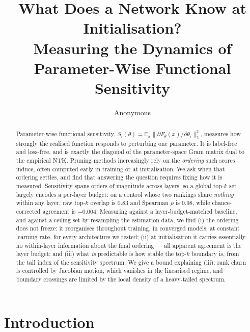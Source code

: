 \documentclass{article}
\title{What Does a Network Know at Initialisation?\\
Measuring the Dynamics of Parameter-Wise Functional Sensitivity}
\author{Anonymous}
\begin{document}
\maketitle

\begin{abstract}
Parameter-wise functional sensitivity, $S_i(\theta)=\mathbb E_x\|\partial F_\theta(x)/\partial\theta_i\|_2^2$,
measures how strongly the realised function responds to perturbing one parameter. It is
label-free and loss-free, and is exactly the diagonal of the parameter-space Gram matrix
dual to the empirical NTK. Pruning methods increasingly rely on the \emph{ordering} such
scores induce, often computed early in training or at initialisation. We ask when that
ordering settles, and find that answering the question requires fixing how it is measured.
Sensitivity spans orders of magnitude across layers, so a global top-$k$ set largely encodes
a per-layer budget: on a control whose two rankings share \emph{nothing} within any layer,
raw top-$k$ overlap is $0.83$ and Spearman $\rho$ is $0.98$, while chance-corrected agreement
is $-0.004$. Measuring against a layer-budget-matched baseline, and against a ceiling set by
resampling the estimation data, we find (i) the ordering does not freeze: it reorganises
throughout training, in converged models, at constant learning rate, for every architecture
we tested; (ii) at initialisation it carries essentially no within-layer information about
the final ordering --- all apparent agreement is the layer budget; and (iii) what \emph{is}
predictable is how stable the top-$k$ boundary is, from the tail index of the sensitivity
spectrum. We give a bound explaining (iii): rank churn is controlled by Jacobian motion,
which vanishes in the linearised regime, and boundary crossings are limited by the local
density of a heavy-tailed spectrum. %
\end{abstract}

\section{Introduction}
\end{document}
